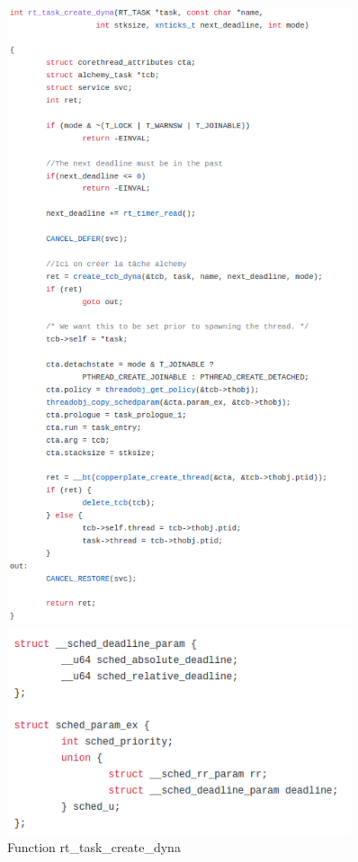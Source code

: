 \documentclass[12pt,hidelinks]{article}
\begin{document}
{\begin{itemize}
    \begin{figure}[ht]
        \centering
        \begin{minipage}{0.45\textwidth}
            \centering
            \includegraphics[width=0.9\textwidth]{rt_task_create_dyna_func.png} %
            \caption{Function rt\_task\_create\_dyna}
        \end{minipage}\hfill
        \begin{minipage}{0.45\textwidth}
            \centering
            \includegraphics[width=0.9\textwidth]{struct __sched_deadline_param.png} %

\end{minipage}
\end{figure}
\end{itemize}}
\end{document}
